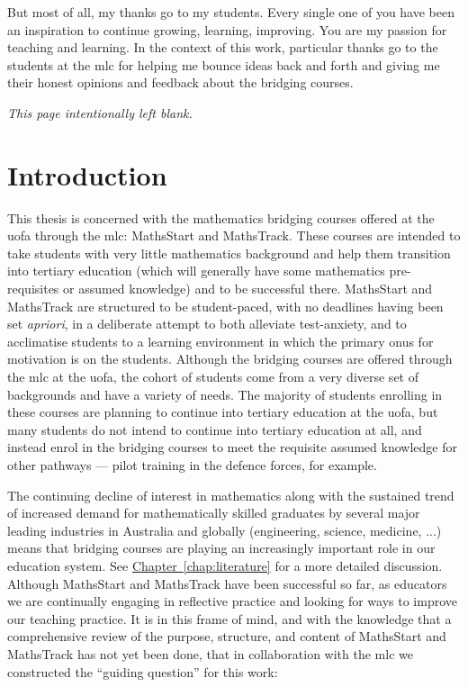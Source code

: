 \documentclass[twoside,12pt,a4paper]{report}
\makeatletter
\newcommand*{\intentionallyblankpage}{
  \vspace*{\fill}
  {\centering \textit{This page intentionally left blank.} \par}
  \vspace{\fill}}
\renewcommand*{\cleardoublepage}{\clearpage\if@twoside \ifodd\c@page\else
  \intentionallyblankpage
  \newpage
  \if@twocolumn\hbox{}\newpage\fi\fi\fi}
\newcommand{\refchap}[1]{\hyperref[chap:#1]{Chapter~\ref{chap:#1}}}
\makeatother
\begin{document}
But most of all, my thanks go to my students. Every single one of you have been an inspiration to continue growing, learning, improving. You are my passion for teaching and learning. In the context of this work, particular thanks go to the students at the \gls{mlc} for helping me bounce ideas back and forth and giving me their honest opinions and feedback about the bridging courses.






\cleardoublepage
\chapter{Introduction}
\label{chap:intro}

\glsresetall

This thesis is concerned with the mathematics bridging courses offered at the \gls{uofa} through the \gls{mlc}: MathsStart and MathsTrack. These courses are intended to take students with very little mathematics background and help them transition into tertiary education (which will generally have some mathematics pre-requisites or assumed knowledge) and to be successful there. MathsStart and MathsTrack are structured to be student-paced, with no deadlines having been set \textit{apriori}, in a deliberate attempt to both alleviate test-anxiety, and to acclimatise students to a learning environment in which the primary onus for motivation is on the students. Although the bridging courses are offered through the \gls{mlc} at the \gls{uofa}, the cohort of students come from a very diverse set of backgrounds and have a variety of needs. The majority of students enrolling in these courses are planning to continue into tertiary education at the \gls{uofa}, but many students do not intend to continue into tertiary education at all, and instead enrol in the bridging courses to meet the requisite assumed knowledge for other pathways --- pilot training in the defence forces, for example. 

The continuing decline of interest in mathematics along with the sustained trend of increased demand for mathematically skilled graduates by several major leading industries in Australia and globally (engineering, science, medicine, ...) means that bridging courses are playing an increasingly important role in our education system. See \refchap{literature} for a more detailed discussion. Although MathsStart and MathsTrack have been successful so far, as educators we are continually engaging in reflective practice and looking for ways to improve our teaching practice. It is in this frame of mind, and with the knowledge that a comprehensive review of the purpose, structure, and content of MathsStart and MathsTrack has not yet been done, that in collaboration with the \gls{mlc} we constructed the ``guiding question'' for this work:
\end{document}
